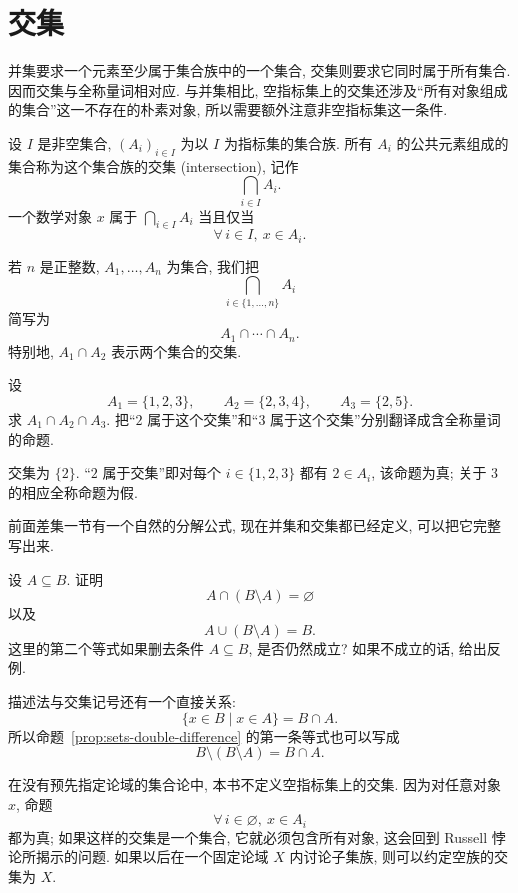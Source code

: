 \documentclass[usesamecnt, thmcnt=section, lang=cn, newtx, 10pt, scheme=chinese]{elegantbook}
\begin{document}
\section{交集}

并集要求一个元素至少属于集合族中的一个集合, 交集则要求它同时属于所有集合. 因而交集与全称量词相对应. 与并集相比, 空指标集上的交集还涉及``所有对象组成的集合''这一不存在的朴素对象, 所以需要额外注意非空指标集这一条件.

\begin{definition}[交集]\label{def:sets-intersection}
设 $I$ 是非空集合, $(A_i)_{i\in I}$ 为以 $I$ 为指标集的集合族. 所有 $A_i$ 的公共元素组成的集合称为这个集合族的{\color{blue}交集 (intersection)}, 记作
\[
 \bigcap_{i\in I}A_i.
\]
一个数学对象 $x$ 属于 $\bigcap_{i\in I}A_i$ 当且仅当
\[
 \forall\,i\in I,\ x\in A_i.
\]
\end{definition}

若 $n$ 是正整数, $A_1,\ldots,A_n$ 为集合, 我们把
\[
 \bigcap_{i\in\{1,\ldots,n\}}A_i
\]
简写为
\[
 A_1\cap\cdots\cap A_n.
\]
特别地, $A_1\cap A_2$ 表示两个集合的交集.

\begin{concept}\label{con:sets-12}
设
\[
 A_1=\{1,2,3\},\qquad A_2=\{2,3,4\},\qquad A_3=\{2,5\}.
\]
求 $A_1\cap A_2\cap A_3$. 把``$2$ 属于这个交集''和``$3$ 属于这个交集''分别翻译成含全称量词的命题.
\end{concept}

\begin{solution}
交集为 $\{2\}$. ``$2$ 属于交集''即对每个 $i\in\{1,2,3\}$ 都有 $2\in A_i$, 该命题为真; 关于 $3$ 的相应全称命题为假.
\end{solution}

前面差集一节有一个自然的分解公式, 现在并集和交集都已经定义, 可以把它完整写出来.

\begin{exercise}\label{ex:sets-difference-01}
设 $A\subseteq B$. 证明
\[
 A\cap(B\setminus A)=\varnothing
\]
以及
\[
 A\cup(B\setminus A)=B.
\]
这里的第二个等式如果删去条件 $A\subseteq B$, 是否仍然成立? 如果不成立的话, 给出反例.
\end{exercise}

描述法与交集记号还有一个直接关系:
\[
 \{x\in B\mid x\in A\}=B\cap A.
\]
所以命题~\ref{prop:sets-double-difference} 的第一条等式也可以写成
\[
 B\setminus(B\setminus A)=B\cap A.
\]

\begin{remark}
在没有预先指定论域的集合论中, 本书不定义空指标集上的交集. 因为对任意对象 $x$, 命题
\[
 \forall\,i\in\varnothing,\ x\in A_i
\]
都为真; 如果这样的交集是一个集合, 它就必须包含所有对象, 这会回到 Russell 悖论所揭示的问题. 如果以后在一个固定论域 $X$ 内讨论子集族, 则可以约定空族的交集为 $X$.
\end{remark}
\end{document}
